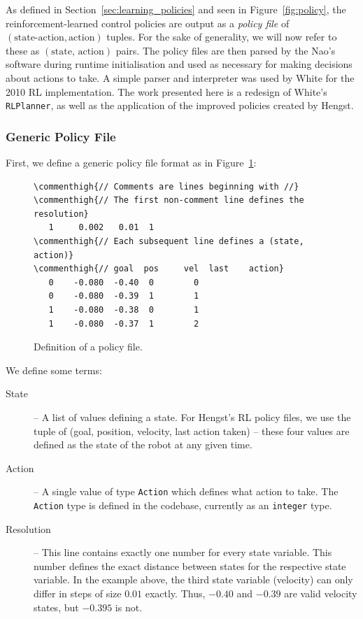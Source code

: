 As defined in Section~\ref{sec:learning_policies} and seen in Figure~\ref{fig:policy}, the reinforcement-learned control policies are output as a \textit{policy file} of $(\text{state-action}, \text{action})$ tuples. For the sake of generality, we will now refer to these as $(\text{state, action})$ pairs. The policy files are then parsed by the Nao's software during runtime initialisation and used as necessary for making decisions about actions to take. A simple parser and interpreter was used by White for the 2010 RL implementation.\cite{white} The work presented here is a redesign of White's \texttt{RLPlanner}, as well as the application of the improved policies created by Hengst.

\subsubsection{Generic Policy File}

First, we define a generic policy file format as in Figure~\ref{fig:policy_def}:

\begin{figure}[h]
\newcommand\commenthigh[1]{\textcolor[rgb]{0,0.5,0}{#1}}
\begin{Verbatim}[commandchars=\\\{\},frame=single]
\commenthigh{// Comments are lines beginning with //}
\commenthigh{// The first non-comment line defines the resolution}
   1     0.002   0.01  1
\commenthigh{// Each subsequent line defines a (state, action)}
\commenthigh{// goal  pos     vel  last    action}
   0    -0.080  -0.40  0        0
   0    -0.080  -0.39  1        1
   1    -0.080  -0.38  0        1
   1    -0.080  -0.37  1        2
\end{Verbatim}
\vspace{-15pt}
\caption{Definition of a policy file.}
\label{fig:policy_def}
\end{figure}

We define some terms:

\begin{description}
\item[State] -- A list of values defining a state. For Hengst's RL policy files, we use the tuple of (goal, position, velocity, last action taken) -- these four values are defined as the state of the robot at any given time.
\item[Action] -- A single value of type \texttt{Action} which defines what action to take. The \texttt{Action} type is defined in the codebase, currently as an \texttt{integer} type.
\item[Resolution] -- This line contains exactly one number for every state variable. This number defines the exact distance between states for the respective state variable. In the example above, the third state variable (velocity) can only differ in steps of size $0.01$ exactly. Thus, $-0.40$ and $-0.39$ are valid velocity states, but $-0.395$ is not.
\end{description}


